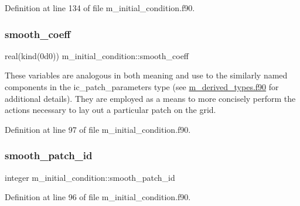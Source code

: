 Definition at line 134 of file m\+\_\+initial\+\_\+condition.\+f90.

\mbox{\label{namespacem__initial__condition_a7ab7ae2808ac3b52319477860c6dbf80}} 
\subsubsection{\texorpdfstring{smooth\+\_\+coeff}{smooth\_coeff}}
{\footnotesize\ttfamily real(kind(0d0)) m\+\_\+initial\+\_\+condition\+::smooth\+\_\+coeff}



These variables are analogous in both meaning and use to the similarly named components in the ic\+\_\+patch\+\_\+parameters type (see \hyperlink{m__derived__types_8f90}{m\+\_\+derived\+\_\+types.\+f90} for additional details). They are employed as a means to more concisely perform the actions necessary to lay out a particular patch on the grid. 



Definition at line 97 of file m\+\_\+initial\+\_\+condition.\+f90.

\mbox{\label{namespacem__initial__condition_adf36787dd781f2f28d1b49d06116c401}} 
\subsubsection{\texorpdfstring{smooth\+\_\+patch\+\_\+id}{smooth\_patch\_id}}
{\footnotesize\ttfamily integer m\+\_\+initial\+\_\+condition\+::smooth\+\_\+patch\+\_\+id}



Definition at line 96 of file m\+\_\+initial\+\_\+condition.\+f90.

\mbox{\label{namespacem__initial__condition_aba65d4cbd29f3b8eda828037c7215e2d}} 
